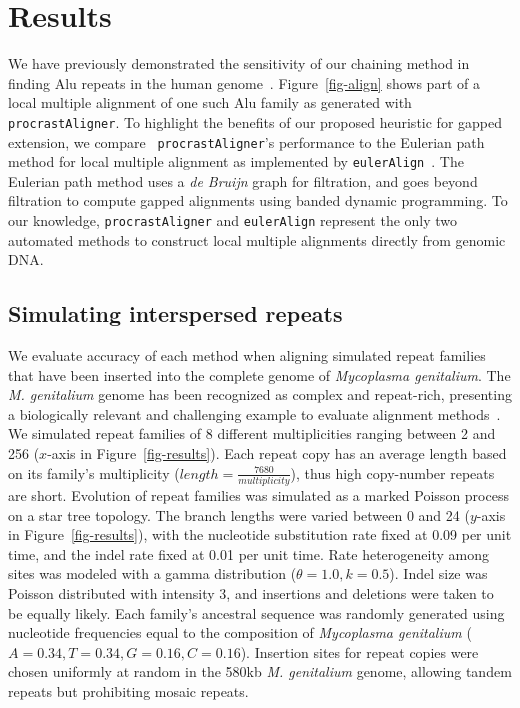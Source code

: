 \documentclass[9.5pt,journal,final,finalsubmission,twocolumn]{IEEEtran}
\begin{document}
\section{Results}
We have previously demonstrated the sensitivity of our chaining method
in finding Alu repeats in the human
genome~\cite{ref-procrast}. Figure~\ref{fig-align} shows part of a
local multiple alignment of one such Alu family as generated with
\texttt{procrastAligner}. To highlight the benefits of our proposed
heuristic for gapped extension, we compare ~\texttt{procrastAligner}'s
performance to the Eulerian path method for local multiple alignment
as implemented by \texttt{eulerAlign}~\cite{ref-related1}. The Eulerian
path method uses a \textit{de Bruijn} graph for filtration, and goes
beyond filtration to compute gapped alignments using banded dynamic
programming.  To our knowledge, \texttt{procrastAligner} and
\texttt{eulerAlign} represent the only two automated methods to
construct local multiple alignments directly from genomic DNA.

\subsection{Simulating interspersed repeats}
We evaluate accuracy of each method when aligning simulated repeat
families that have been inserted into the complete genome of
\emph{Mycoplasma genitalium}. The \emph{M. genitalium} genome has been recognized
as complex and repeat-rich, presenting a biologically
relevant and challenging example to evaluate alignment
methods~\cite{ref-mycoplasma}. We simulated repeat families of 8
different multiplicities ranging between 2 and 256 ($x$-axis in
Figure~\ref{fig-results}).  Each repeat copy has an average length
based on its family's multiplicity
($length=\frac{7680}{multiplicity}$), thus high copy-number repeats
are short.  Evolution of repeat families was simulated as a marked
Poisson process on a star tree
topology.  The branch lengths were varied between 0 and 24 ($y$-axis
in Figure~\ref{fig-results}), with the nucleotide substitution rate
fixed at 0.09 per unit time, and the indel rate fixed at 0.01 per
unit time.  Rate heterogeneity among sites was modeled with a gamma
distribution ($\theta = 1.0, k = 0.5$).  Indel size was
Poisson distributed with intensity 3, and insertions and deletions
were taken to be equally likely.  Each family's ancestral
sequence was randomly generated using nucleotide frequencies equal to
the composition of \emph{Mycoplasma genitalium}
($A=0.34,T=0.34,G=0.16,C=0.16$). Insertion sites for repeat copies
were chosen uniformly at random in the 580kb \textit{M. genitalium} genome,
allowing tandem repeats but prohibiting mosaic repeats.
\end{document}
